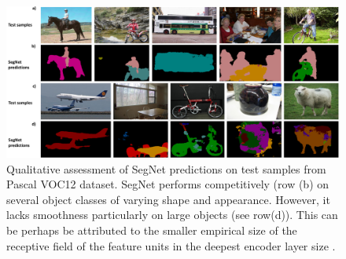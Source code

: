 \begin{figure}[t]
\centering
\includegraphics[width=\textwidth]{segnet/PascalQualy2.pdf}
\caption[Qualitative assessment of SegNet on Pascal VOC12]{Qualitative assessment of SegNet predictions on test samples from Pascal VOC12 \citep{pascal} dataset. SegNet performs competitively (row (b) on several object classes of varying shape and appearance. However, it lacks smoothness particularly on large objects (see row(d)). This can be perhaps be attributed to the smaller empirical size of the receptive field of the feature units in the deepest encoder layer size \citep{zhou2014object}.}
\label{PascalQualy}
\end{figure}

